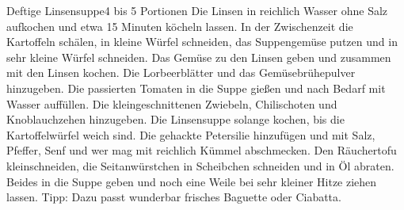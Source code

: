 \documentclass[a4paper,10pt]{article}
\begin{document}
    \begin{recipe}{Deftige Linsensuppe}{4 bis 5 Portionen}{}
        Die Linsen in reichlich Wasser ohne Salz aufkochen und etwa 15 Minuten köcheln lassen.
        In der Zwischenzeit die Kartoffeln schälen, in kleine Würfel schneiden, das Suppengemüse putzen 
        und in sehr kleine Würfel schneiden. Das Gemüse zu den Linsen geben und zusammen mit den Linsen kochen.
        Die Lorbeerblätter und das Gemüsebrühepulver hinzugeben. Die passierten Tomaten in die Suppe gießen
        und nach Bedarf mit Wasser auffüllen.
        Die kleingeschnittenen Zwiebeln, Chilischoten und Knoblauchzehen hinzugeben.
        Die Linsensuppe solange kochen, bis die Kartoffelwürfel weich sind. 
        Die gehackte Petersilie hinzufügen und mit Salz, Pfeffer, Senf und wer mag mit reichlich Kümmel abschmecken.
        Den Räuchertofu kleinschneiden, die Seitanwürstchen in Scheibchen schneiden und in Öl abraten. 
        Beides in die Suppe geben und noch eine Weile bei sehr kleiner Hitze ziehen lassen. 
        \freeform Tipp: Dazu passt wunderbar frisches Baguette oder Ciabatta.
        
        \freeform \hfill 
        
    \end{recipe}
    
\end{document}
